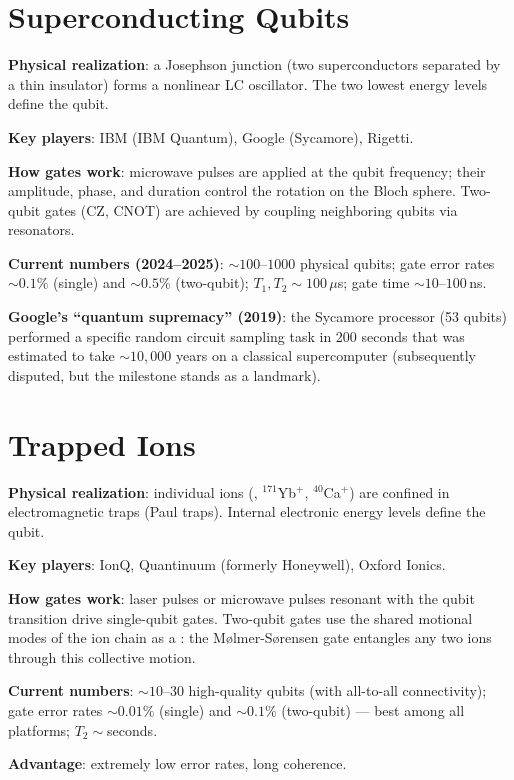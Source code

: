 \documentclass[oneside]{academica}
\begin{document}
\section{Superconducting Qubits}

\textbf{Physical realization}: a Josephson junction (two superconductors separated by a thin insulator) forms a nonlinear LC oscillator.
The two lowest energy levels define the qubit.

\textbf{Key players}: IBM (IBM Quantum), Google (Sycamore), Rigetti.

\textbf{How gates work}: microwave pulses are applied at the qubit frequency; their amplitude, phase, and duration control the rotation on the Bloch sphere.
Two-qubit gates (CZ, CNOT) are achieved by coupling neighboring qubits via resonators.

\textbf{Current numbers (2024--2025)}: $\sim100$--$1000$ physical qubits; gate error rates $\sim0.1\%$ (single) and $\sim0.5\%$ (two-qubit); $T_1,T_2\sim100\,\mu$s; gate time $\sim10$--$100\,$ns.

\textbf{Google's ``quantum supremacy'' (2019)}: the Sycamore processor (53 qubits) performed a specific random circuit sampling task in 200 seconds that was estimated to take $\sim10{,}000$ years on a classical supercomputer (subsequently disputed, but the milestone stands as a landmark).

\section{Trapped Ions}

\textbf{Physical realization}: individual ions (\eg, $^{171}$Yb$^+$, $^{40}$Ca$^+$) are confined in electromagnetic traps (Paul traps).
Internal electronic energy levels define the qubit.

\textbf{Key players}: IonQ, Quantinuum (formerly Honeywell), Oxford Ionics.

\textbf{How gates work}: laser pulses or microwave pulses resonant with the qubit transition drive single-qubit gates.
Two-qubit gates use the shared motional modes of the ion chain as a : the M\o lmer-S\o rensen gate entangles any two ions through this collective motion.

\textbf{Current numbers}: $\sim10$--$30$ high-quality qubits (with all-to-all connectivity); gate error rates $\sim0.01\%$ (single) and $\sim0.1\%$ (two-qubit) --- best among all platforms; $T_2\sim$seconds.

\textbf{Advantage}: extremely low error rates, long coherence.
\end{document}

